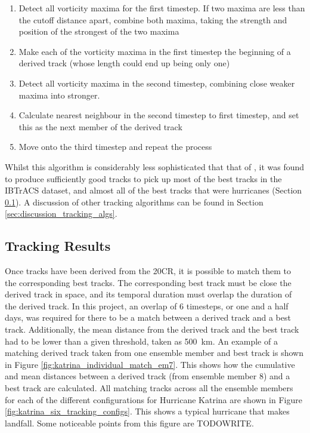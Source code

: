 \documentclass[pdftex,12pt,a4paper]{report}
\begin{document}
\begin{enumerate}
    \item Detect all vorticity maxima for the first timestep. If two maxima are less than the cutoff
        distance apart, combine both maxima, taking the strength and position of the strongest of
        the two maxima
    \item Make each of the vorticity maxima in the first timestep the beginning of a derived track
        (whose length could end up being only one)
    \item Detect all vorticity maxima in the second timestep, combining close weaker maxima into
        stronger. %
    \item Calculate nearest neighbour in the second timestep to first timestep, and set this as the
        next member of the derived track
    \item Move onto the third timestep and repeat the process
\end{enumerate}

Whilst this algorithm is considerably less sophisticated that that of \textcite{hodges1994general},
it was found to produce sufficiently good tracks to pick up most of the best tracks in the IBTrACS
dataset, and almost all of the best tracks that were hurricanes (Section
\ref{sec:results_tracking}). A discussion of other tracking algorithms can be found in Section
\ref{sec:discussion_tracking_algs}.

\subsection{Tracking Results}
\label{sec:results_tracking}

Once tracks have been derived from the 20CR, it is possible to match them to the corresponding best
tracks. The corresponding best track must be close the derived track in space, and its temporal
duration must overlap the duration of the derived track. In this project, an overlap of 6 timesteps,
or one and a half days, was required for there to be a match between a derived track and a best
track. Additionally, the mean distance from the derived track and the best track had to be lower
than a given threshold, taken as \SI{500}{km}. An example of a matching derived track taken from
one ensemble member and best track is shown in Figure \ref{fig:katrina_individual_match_em7}.
This shows how the cumulative and mean distances between a derived track (from ensemble member 8)
and a best track are calculated. All matching tracks across all the ensemble members for each of the
different configurations for Hurricane Katrina are shown in Figure
\ref{fig:katrina_six_tracking_configs}. This shows a typical hurricane that makes landfall. Some
noticeable points from this figure are TODOWRITE.
\end{document}
